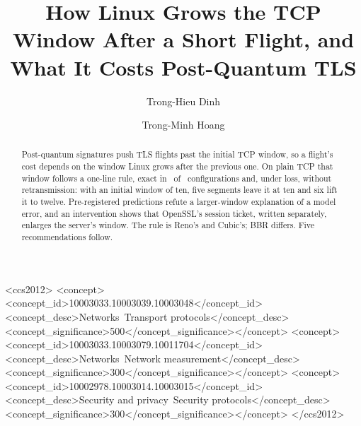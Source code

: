\documentclass[sigconf,9pt,nonacm]{acmart}
\begin{document}
\title{How Linux Grows the TCP Window After a Short Flight, and What It Costs Post-Quantum TLS}
\author{Trong-Hieu Dinh}
\author{Trong-Minh Hoang}
\begin{abstract}
Post-quantum signatures push TLS flights past the initial TCP window, so a flight's cost depends on the window Linux grows after the previous one. On plain TCP that window follows a one-line rule, exact in \NExact\ of \NCfg\ configurations and, under loss, without retransmission: with an initial window of ten, five segments leave it at ten and six lift it to twelve. Pre-registered predictions refute a larger-window explanation of a model error, and an intervention shows that OpenSSL's session ticket, written separately, enlarges the server's window. The rule is Reno's and Cubic's; BBR differs. Five recommendations follow.
\end{abstract}
\begin{CCSXML}
<ccs2012>
<concept><concept_id>10003033.10003039.10003048</concept_id><concept_desc>Networks~Transport protocols</concept_desc><concept_significance>500</concept_significance></concept>
<concept><concept_id>10003033.10003079.10011704</concept_id><concept_desc>Networks~Network measurement</concept_desc><concept_significance>300</concept_significance></concept>
<concept><concept_id>10002978.10003014.10003015</concept_id><concept_desc>Security and privacy~Security protocols</concept_desc><concept_significance>300</concept_significance></concept>
</ccs2012>
\end{CCSXML}
\makeatletter\g@addto@macro\@concepts{\linebreak}\makeatother %
\maketitle
\end{document}
